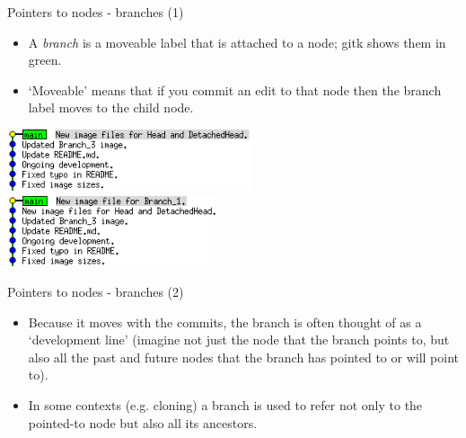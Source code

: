 \documentclass[usenames,dvipsnames]{beamer}
\begin{document}
\begin{frame}{Pointers to nodes - branches (1)}
  \begin{block}{}
    \begin{itemize}
      \item{A \textit{branch} is a moveable label that is attached to a node; gitk shows them in green.}
      \item{`Moveable' means that if you commit an edit to that node then the branch label moves to the child node.}
    \end{itemize}
    \vspace{5mm}
    \begin{center}
      \includegraphics[width=0.54\textwidth]{Branch_1.png}%
      \includegraphics[width=0.46\textwidth]{Branch_2.png}
    \end{center}
  \end{block}
\end{frame}
  
\begin{frame}{Pointers to nodes - branches (2)}
  \begin{block}{}
    \begin{itemize}
      \item{Because it moves with the commits, the branch is often thought of as a `development line' (imagine not just the node that the branch points to, but also all the past and future nodes that the branch has pointed to or will point to).}
      \item{In some contexts (e.g. cloning) a branch is used to refer not only to the pointed-to node but also all its ancestors.}
    \end{itemize}
  \end{block}
\end{frame}
\end{document}
